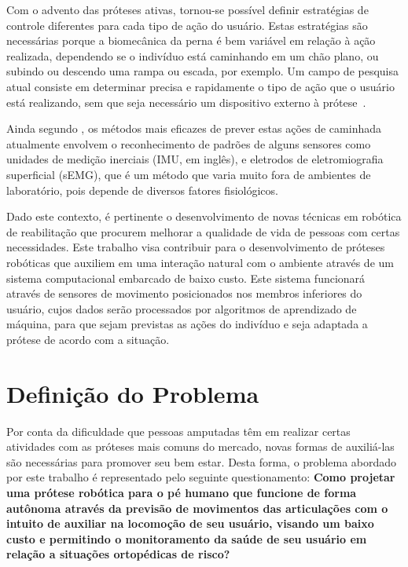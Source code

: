 Com o advento das próteses ativas, tornou-se possível definir estratégias de controle diferentes para cada tipo de ação do usuário. Estas estratégias são necessárias porque a biomecânica da perna é bem variável em relação à ação realizada, dependendo se o indivíduo está caminhando em um chão plano, ou subindo ou descendo uma rampa ou escada, por exemplo. Um campo de pesquisa atual consiste em determinar precisa e rapidamente o tipo de ação que o usuário está realizando, sem que seja necessário um dispositivo externo à prótese~\cite{stolyarov:2017}.

Ainda segundo , os métodos mais eficazes de prever estas ações de caminhada atualmente envolvem o reconhecimento de padrões de alguns sensores como unidades de medição inerciais (IMU, em inglês), e eletrodos de eletromiografia superficial (sEMG), que é um método que varia muito fora de ambientes de laboratório, pois depende de diversos fatores fisiológicos.

Dado este contexto, é pertinente o desenvolvimento de novas técnicas em robótica de reabilitação que procurem melhorar a qualidade de vida de pessoas com certas necessidades. Este trabalho visa contribuir para o desenvolvimento de próteses robóticas que auxiliem em uma interação natural com o ambiente através de um sistema computacional embarcado de baixo custo. Este sistema funcionará através de sensores de movimento posicionados nos membros inferiores do usuário, cujos dados serão processados por algoritmos de aprendizado de máquina, para que sejam previstas as ações do indivíduo e seja adaptada a prótese de acordo com a situação.

\section{Definição do Problema}

Por conta da dificuldade que pessoas amputadas têm em realizar certas atividades com as próteses mais comuns do mercado, novas formas de auxiliá-las são necessárias para promover seu bem estar. Desta forma, o problema abordado por este trabalho é representado pelo seguinte questionamento: \textbf{Como projetar uma prótese robótica para o pé humano que funcione de forma autônoma através da previsão de movimentos das articulações com o intuito de auxiliar na locomoção de seu usuário, visando um baixo custo e permitindo o monitoramento da saúde de seu usuário em relação a situações ortopédicas de risco?}	


